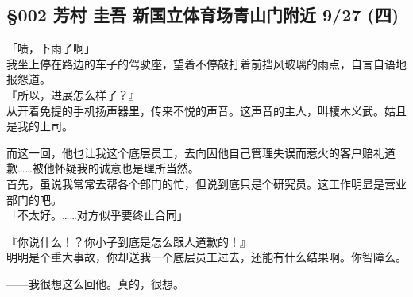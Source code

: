 \subsection{§002 芳村 圭吾 新国立体育场青山门附近 9/27 (四)}

「啧，下雨了啊」\\

我坐上停在路边的车子的驾驶座，望着不停敲打着前挡风玻璃的雨点，自言自语地报怨道。\\

『所以，进展怎么样了？』\\

从开着免提的手机扬声器里，传来不悦的声音。这声音的主人，叫榎木义武。姑且是我的上司。

而这一回，他也让我这个底层员工，去向因他自己管理失误而惹火的客户赔礼道歉……被他怀疑我的诚意也是理所当然。\\

首先，虽说我常常去帮各个部门的忙，但说到底只是个研究员。这工作明显是营业部门的吧。\\

「不太好。……对方似乎要终止合同」

『你说什么！？你小子到底是怎么跟人道歉的！』\\

明明是个重大事故，你却送我一个底层员工过去，还能有什么结果啊。你智障么。

——我很想这么回他。真的，很想。\\

